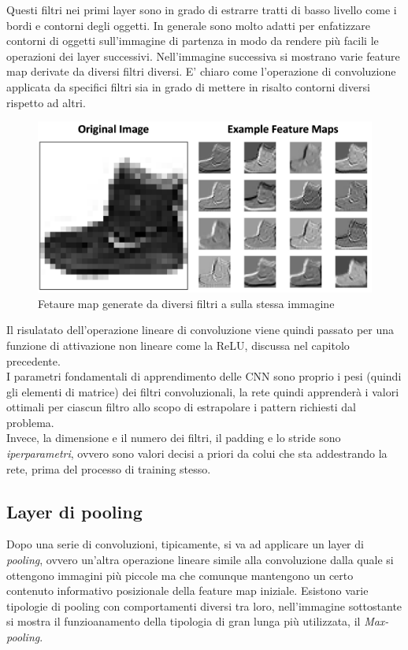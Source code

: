 \documentclass[12pt,a4paper,openright,twoside]{report}
\begin{document}
Questi filtri nei primi layer sono in grado di estrarre tratti di basso livello come i bordi e contorni degli oggetti. In generale sono molto adatti per enfatizzare contorni di oggetti sull'immagine di partenza in modo da rendere più facili le operazioni dei layer successivi.
Nell'immagine successiva si mostrano varie feature map derivate da diversi filtri diversi. E' chiaro come l'operazione di convoluzione applicata da specifici filtri sia in grado di mettere in risalto contorni diversi rispetto ad altri.
\begin{figure}[h]
\centering
\includegraphics[width=\linewidth]{fetaureMaps.png}
\caption{Fetaure map generate da diversi filtri a sulla stessa immagine}
\end{figure}
Il risulatato dell'operazione lineare di convoluzione viene quindi passato per una funzione di attivazione non lineare come la ReLU, discussa nel capitolo precedente.\\

I parametri fondamentali di apprendimento delle CNN sono proprio i pesi (quindi gli elementi di matrice) dei filtri convoluzionali, la rete quindi apprenderà i valori ottimali per ciascun filtro allo scopo di estrapolare i pattern richiesti dal problema.
\\
Invece, la dimensione e il numero dei filtri, il padding e lo stride sono \emph{iperparametri}, ovvero sono valori decisi a priori da colui che sta addestrando la rete, prima del processo di training stesso. 
\newpage
\subsection{Layer di pooling}
Dopo una serie di convoluzioni, tipicamente, si va ad applicare un layer di \emph{pooling}, ovvero un'altra operazione lineare simile alla convoluzione dalla quale si ottengono immagini più piccole ma che comunque mantengono un certo contenuto informativo posizionale della feature map iniziale.
Esistono varie tipologie di pooling con comportamenti diversi tra loro, nell'immagine sottostante si mostra il funzioanamento della tipologia di gran lunga più utilizzata, il \emph{Max-pooling}.
\end{document}
